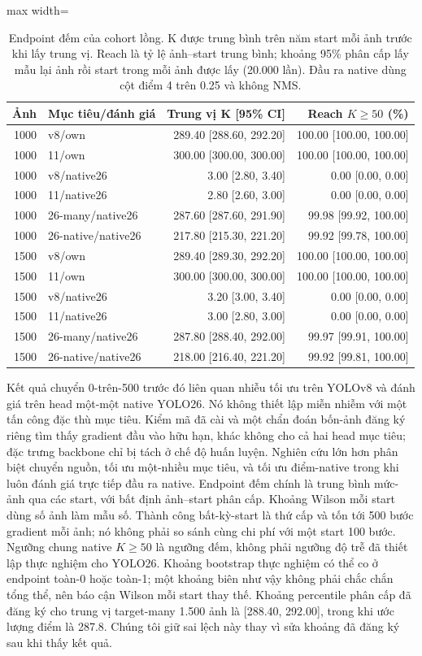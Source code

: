 \begin{table}[t]\centering\small
\caption{Endpoint đếm của cohort lồng. K được trung bình trên năm start mỗi ảnh trước khi lấy trung vị. Reach là tỷ lệ ảnh--start trung bình; khoảng 95\% phân cấp lấy mẫu lại ảnh rồi start trong mỗi ảnh được lấy (20.000 lần). Đầu ra native dùng cột điểm 4 trên 0.25 và không NMS.}
\label{tab:nested1500}\begin{adjustbox}{max width=\textwidth}\begin{tabular}{rlrr}\hline
Ảnh & Mục tiêu/đánh giá & Trung vị K [95\% CI] & Reach $K\geq50$ (\%)\\\hline
1000 & v8/own & 289.40 [288.60, 292.20] & 100.00 [100.00, 100.00]\\
1000 & 11/own & 300.00 [300.00, 300.00] & 100.00 [100.00, 100.00]\\
1000 & v8/native26 & 3.00 [2.80, 3.40] & 0.00 [0.00, 0.00]\\
1000 & 11/native26 & 2.80 [2.60, 3.00] & 0.00 [0.00, 0.00]\\
1000 & 26-many/native26 & 287.60 [287.60, 291.90] & 99.98 [99.92, 100.00]\\
1000 & 26-native/native26 & 217.80 [215.30, 221.20] & 99.92 [99.78, 100.00]\\
1500 & v8/own & 289.40 [289.30, 292.20] & 100.00 [100.00, 100.00]\\
1500 & 11/own & 300.00 [300.00, 300.00] & 100.00 [100.00, 100.00]\\
1500 & v8/native26 & 3.20 [3.00, 3.40] & 0.00 [0.00, 0.00]\\
1500 & 11/native26 & 3.00 [2.80, 3.00] & 0.00 [0.00, 0.00]\\
1500 & 26-many/native26 & 287.80 [288.40, 292.00] & 99.97 [99.91, 100.00]\\
1500 & 26-native/native26 & 218.00 [216.40, 221.20] & 99.92 [99.81, 100.00]\\
\hline\end{tabular}\end{adjustbox}\end{table}
Kết quả chuyển 0-trên-500 trước đó liên quan nhiễu tối ưu trên YOLOv8 và đánh giá trên head một-một native YOLO26. Nó không thiết lập miễn nhiễm với một tấn công đặc thù mục tiêu. Kiểm mã đã cài và một chẩn đoán bốn-ảnh đăng ký riêng tìm thấy gradient đầu vào hữu hạn, khác không cho cả hai head mục tiêu; đặc trưng backbone chỉ bị tách ở chế độ huấn luyện. Nghiên cứu lớn hơn phân biệt chuyển nguồn, tối ưu một-nhiều mục tiêu, và tối ưu điểm-native trong khi luôn đánh giá trực tiếp đầu ra native. Endpoint đếm chính là trung bình mức-ảnh qua các start, với bất định ảnh--start phân cấp. Khoảng Wilson mỗi start dùng số ảnh làm mẫu số. Thành công bất-kỳ-start là thứ cấp và tốn tới 500 bước gradient mỗi ảnh; nó không phải so sánh cùng chi phí với một start 100 bước. Ngưỡng chung native $K\geq50$ là ngưỡng đếm, không phải ngưỡng độ trễ đã thiết lập thực nghiệm cho YOLO26. Khoảng bootstrap thực nghiệm có thể co ở endpoint toàn-0 hoặc toàn-1; một khoảng biên như vậy không phải chắc chắn tổng thể, nên báo cận Wilson mỗi start thay thế. Khoảng percentile phân cấp đã đăng ký cho trung vị target-many 1.500 ảnh là [288.40, 292.00], trong khi ước lượng điểm là 287.8. Chúng tôi giữ sai lệch này thay vì sửa khoảng đã đăng ký sau khi thấy kết quả.
